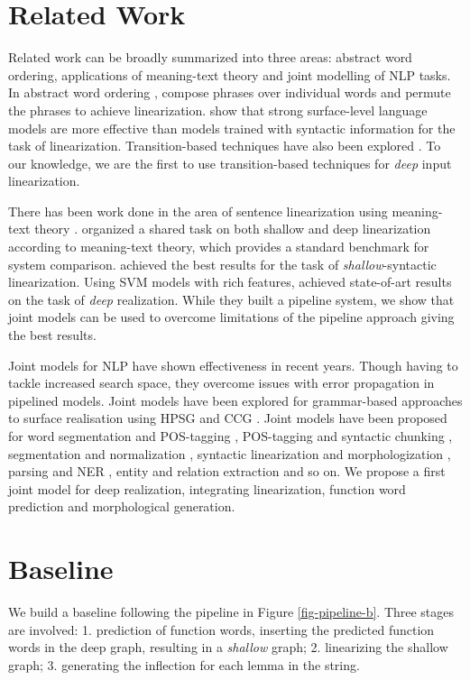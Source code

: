 \documentclass[11pt]{article}
\begin{document}
\section{Related Work}
Related work can be broadly summarized into three areas: abstract word ordering, applications of meaning-text theory and joint modelling of  NLP tasks. In abstract word ordering \cite{E09-1097,zhang2013partial,zhang2015discriminative},  compose phrases over individual words and permute the phrases to achieve linearization.  show that strong surface-level language models are more effective than models trained with syntactic information for the task of linearization. Transition-based techniques have also been explored \cite{LiuZCQ15,liu-zhang:2015:EMNLP,N16-1058}. To our knowledge, we are the first to use transition-based techniques for {\it deep} input linearization.

There has been work done in the area of sentence linearization using meaning-text theory \cite{melʹvcuk1988dependency}.  organized a shared task on both shallow and deep linearization according to meaning-text theory, which provides a standard benchmark for system comparison.  achieved the best results for the task of {\it shallow}-syntactic linearization.
Using SVM models with rich features,  achieved state-of-art results on the task of {\it deep} realization. While they built a pipeline system, we show that joint models can be used to overcome limitations of the pipeline approach giving the best results. 

Joint models for NLP have shown effectiveness in recent years. Though having to tackle increased search space, they overcome issues with error propagation in pipelined models. Joint models have been explored for grammar-based approaches to surface realisation using HPSG and CCG \cite{I05-1015,W06-1661,P08-1022,D09-1043,white2006efficient,carroll1999efficient}. Joint models have been proposed for word segmentation and POS-tagging \cite{zhang2010fast}, POS-tagging and syntactic chunking \cite{sutton2007dynamic},  segmentation and normalization \cite{tao-zhang-zhang-ji:2015:EMNLP}, syntactic linearization and morphologization \cite{song2014joint}, parsing and NER \cite{N09-1037}, entity and relation extraction \cite{P14-1038} and so on. We propose a first joint model for deep realization, integrating linearization, function word prediction and morphological generation.

\section{Baseline}
We build a baseline following the pipeline in Figure \ref{fig-pipeline-b}. Three stages are involved: 1. prediction of function words, inserting the predicted function words in the deep graph, resulting in a {\it shallow} graph; 2. linearizing the shallow graph; 3. generating the inflection for each lemma in the string.
\end{document}
